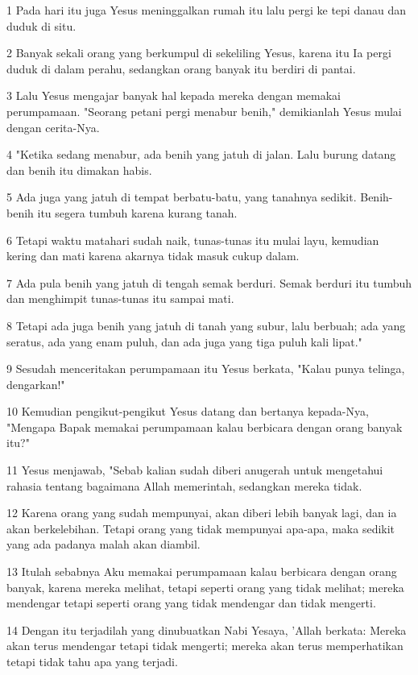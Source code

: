 \par 1 Pada hari itu juga Yesus meninggalkan rumah itu lalu pergi ke tepi danau dan duduk di situ.
\par 2 Banyak sekali orang yang berkumpul di sekeliling Yesus, karena itu Ia pergi duduk di dalam perahu, sedangkan orang banyak itu berdiri di pantai.
\par 3 Lalu Yesus mengajar banyak hal kepada mereka dengan memakai perumpamaan. "Seorang petani pergi menabur benih," demikianlah Yesus mulai dengan cerita-Nya.
\par 4 "Ketika sedang menabur, ada benih yang jatuh di jalan. Lalu burung datang dan benih itu dimakan habis.
\par 5 Ada juga yang jatuh di tempat berbatu-batu, yang tanahnya sedikit. Benih-benih itu segera tumbuh karena kurang tanah.
\par 6 Tetapi waktu matahari sudah naik, tunas-tunas itu mulai layu, kemudian kering dan mati karena akarnya tidak masuk cukup dalam.
\par 7 Ada pula benih yang jatuh di tengah semak berduri. Semak berduri itu tumbuh dan menghimpit tunas-tunas itu sampai mati.
\par 8 Tetapi ada juga benih yang jatuh di tanah yang subur, lalu berbuah; ada yang seratus, ada yang enam puluh, dan ada juga yang tiga puluh kali lipat."
\par 9 Sesudah menceritakan perumpamaan itu Yesus berkata, "Kalau punya telinga, dengarkan!"
\par 10 Kemudian pengikut-pengikut Yesus datang dan bertanya kepada-Nya, "Mengapa Bapak memakai perumpamaan kalau berbicara dengan orang banyak itu?"
\par 11 Yesus menjawab, "Sebab kalian sudah diberi anugerah untuk mengetahui rahasia tentang bagaimana Allah memerintah, sedangkan mereka tidak.
\par 12 Karena orang yang sudah mempunyai, akan diberi lebih banyak lagi, dan ia akan berkelebihan. Tetapi orang yang tidak mempunyai apa-apa, maka sedikit yang ada padanya malah akan diambil.
\par 13 Itulah sebabnya Aku memakai perumpamaan kalau berbicara dengan orang banyak, karena mereka melihat, tetapi seperti orang yang tidak melihat; mereka mendengar tetapi seperti orang yang tidak mendengar dan tidak mengerti.
\par 14 Dengan itu terjadilah yang dinubuatkan Nabi Yesaya, 'Allah berkata: Mereka akan terus mendengar tetapi tidak mengerti; mereka akan terus memperhatikan tetapi tidak tahu apa yang terjadi.

